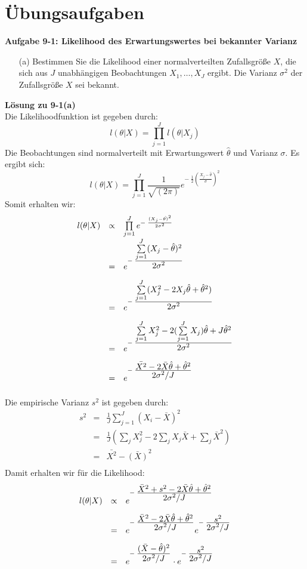 \newpage
\section{Übungsaufgaben}
\textbf{Aufgabe 9-1: Likelihood des Erwartungswertes bei bekannter Varianz}
\begin{itemize}
	\item [(a)] Bestimmen Sie die Likelihood einer normalverteilten Zufallsgröße $X$, die sich aus $J$ unabhängigen Beobachtungen $X_1,\ldots,X_J$ ergibt. 
	Die Varianz $\sigma^2$ der Zufallsgröße $X$ sei bekannt.
\end{itemize}

\textbf{Lösung zu 9-1(a)} \\
Die Likelihoodfunktion ist gegeben durch: 
\[
l(\theta|X) = \prod_{j=1}^{J} l(\theta|X_j)
\]
Die Beobachtungen sind normalverteilt mit Erwartungswert 
$\hat{\theta}$ und Varianz $\sigma$. Es ergibt sich: 
\[
l(\theta|X) = \prod_{j=1}^{J} \frac{1}{\sqrt{(2 \pi)}} 
e^{-\;\frac{1}{2}\left(\frac{X_j-\hat{\theta}}{\sigma}\right)^2}
\]
Somit erhalten wir: 
\[
\begin{array}{rcl}
l(\theta|X) & \propto &  \prod\limits_{j=1}^{J} 
e^{-\;\frac{(X_j-\hat{\theta)}^2}{2\sigma^2}} \\[2ex]
&=& e^{-\;\frac{\textstyle\sum\limits_{j=1}^{J}(X_j-\hat{\theta})^2}
	{\textstyle 2 \sigma^2}} \\[2ex]
&=& e^{-\;\frac{\textstyle\sum\limits_{j=1}^{J}(X_j^2-2X_j\hat{\theta}
	+\hat{\theta}^2)}
	{\textstyle 2 \sigma^2}} \\[2ex]
&=& e^{-\;\frac{\textstyle\sum\limits_{j=1}^{J}X_j^2 
		- 2 (\sum\limits_{j=1}^{J}X_j) \hat{\theta}
		+J \hat{\theta}^2}
	{\textstyle 2 \sigma^2}} \\[2ex]
&=& e^{-\;\frac{\textstyle \bar{X^2}-2\bar{X}\hat{\theta}+\hat{\theta}^2}
	{\textstyle 2 \sigma^2/J}} \\[2ex]
\end{array}
\]
Die empirische Varianz $s^2$ ist gegeben durch:
\[
\begin{array}{rcl}
s^2 &=& \frac{1}{J} \sum\limits_{j=1}^{J} (X_i - \bar{X})^2 \\[2ex]
    &=& \frac{1}{J} (\sum_j X_j^2-2 \sum_j X_j \bar{X} + \sum_j \bar{X}^2) \\[2ex]
    &=& \bar{X^2} -\bar{(X)}^2 \\[2ex]
\end{array}
\] 
Damit erhalten wir für die Likelihood:
\[
\begin{array}{rcl}
l(\theta|X) & \propto & 
e^{-\;\frac{\textstyle \bar{X}^2 +s^2 -2\bar{X} \hat{\theta}+\hat{\theta}^2}
	{\textstyle 2 \sigma^2/J}} \\[2ex]
&=& e^{-\;\frac{\textstyle \bar{X}^2 -2\bar{X} \hat{\theta}+\hat{\theta}^2}
	{\textstyle 2 \sigma^2/J}}
e^{-\;\frac{\textstyle s^2 }
	{\textstyle 2 \sigma^2/J}} \\[2ex]
&=& e^{-\;\frac{\textstyle (\bar{X} - \hat{\theta})^2} 
	{\textstyle 2 \sigma^2/J}}
    \cdot e^{-\;\frac{\textstyle s^2 }
	{\textstyle 2 \sigma^2/J}} 
\end{array}
\]
